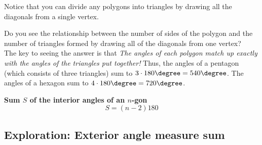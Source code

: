Notice that you can divide any polygons into triangles
by drawing all the diagonals from a single vertex.
	\begin{center}
	\end{center}

\noindent \q Do you see the relationship between the number of sides of the polygon and the number of triangles formed by drawing all of the diagonals from one vertex?\\	
	
The key to seeing the answer is that \textit{The angles of each polygon
match up exactly with the angles of the triangles put together!} 
Thus, the angles of a pentagon (which consists of three triangles) sum to 
$3\cdot180\degree=540\degree$.
The angles of a hexagon sum to $4\cdot 180\degree=720\degree$.



\begin{tcolorbox}
\textbf{Sum $S$ of the interior angles of an $n$-gon}\\

\[S=(n-2)180\]

\end{tcolorbox}

\subsection{Exploration:  Exterior angle measure sum}

